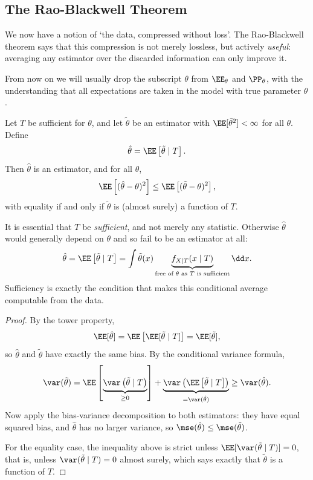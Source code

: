 \subsection{The Rao-Blackwell Theorem}

We now have a notion of `the data, compressed without loss'. The Rao-Blackwell theorem says that this compression is not merely lossless, but actively \emph{useful}: averaging any estimator over the discarded information can only improve it.

From now on we will usually drop the subscript $\theta$ from $\EE_\theta$ and $\PP_\theta$, with the understanding that all expectations are taken in the model with true parameter $\theta$.

\begin{theorem}
  Let $T$ be sufficient for $\theta$, and let $\tilde\theta$ be an estimator with $\EE[\tilde\theta^2] < \infty$ for all $\theta$. Define
  $$
  \hat\theta = \EE\left[\tilde\theta \mid T\right].
  $$
  Then $\hat\theta$ is an estimator, and for all $\theta$,
  $$
  \EE\left[(\hat\theta - \theta)^2\right] \leq \EE\left[(\tilde\theta - \theta)^2\right],
  $$
  with equality if and only if $\tilde\theta$ is (almost surely) a function of $T$.
\end{theorem}

\begin{remark}
  It is essential that $T$ be \emph{sufficient}, and not merely any statistic. Otherwise $\hat\theta$ would generally depend on $\theta$ and so fail to be an estimator at all:
  $$
  \hat\theta = \EE\left[\tilde\theta \mid T\right] = \int \tilde\theta(x) \underbrace{f_{X\mid T}(x \mid T)}_{\text{free of }\theta \text{ as } T \text{ is sufficient}}\dd x.
  $$
  Sufficiency is exactly the condition that makes this conditional average computable from the data.
\end{remark}

\begin{proof}
  By the tower property,
  $$
  \EE[\hat\theta] = \EE\left[\EE[\tilde\theta \mid T]\right] = \EE[\tilde\theta],
  $$
  so $\hat\theta$ and $\tilde\theta$ have exactly the same bias. By the conditional variance formula,
  $$
  \var(\tilde\theta) = \EE\left[\underbrace{\var\left(\tilde\theta \mid T\right)}_{\geq 0}\right] + \underbrace{\var\left(\EE\left[\tilde\theta\mid T\right]\right)}_{= \var(\hat\theta)} \geq \var(\hat\theta).
  $$
  Now apply the bias-variance decomposition to both estimators: they have equal squared bias, and $\hat\theta$ has no larger variance, so $\mse(\hat\theta) \leq \mse(\tilde\theta)$.

  For the equality case, the inequality above is strict unless $\EE[\var(\tilde\theta \mid T)] = 0$, that is, unless $\var(\tilde\theta \mid T) = 0$ almost surely, which says exactly that $\tilde\theta$ is a function of $T$.
\end{proof}

